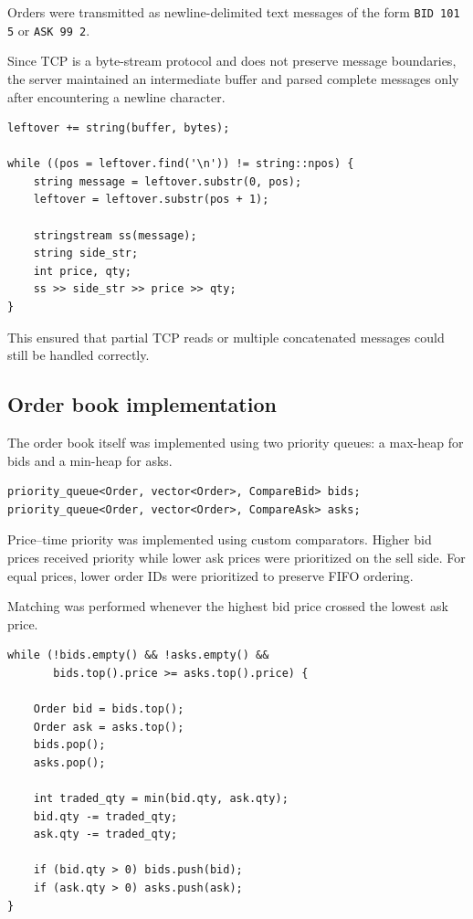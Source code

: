 \documentclass[11pt,a4paper]{article}
\begin{document}
Orders were transmitted as newline-delimited text messages of the form
\texttt{BID 101 5} or \texttt{ASK 99 2}.

Since TCP is a byte-stream protocol and does not preserve message
boundaries, the server maintained an intermediate buffer and parsed complete
messages only after encountering a newline character.

\begin{lstlisting}[caption={Message parsing logic}]
leftover += string(buffer, bytes);

while ((pos = leftover.find('\n')) != string::npos) {
    string message = leftover.substr(0, pos);
    leftover = leftover.substr(pos + 1);

    stringstream ss(message);
    string side_str;
    int price, qty;
    ss >> side_str >> price >> qty;
}
\end{lstlisting}

This ensured that partial TCP reads or multiple concatenated messages could
still be handled correctly.

\subsection{Order book implementation}

The order book itself was implemented using two priority queues: a max-heap
for bids and a min-heap for asks.

\begin{lstlisting}[caption={Order book data structures}]
priority_queue<Order, vector<Order>, CompareBid> bids;
priority_queue<Order, vector<Order>, CompareAsk> asks;
\end{lstlisting}

Price--time priority was implemented using custom comparators. Higher bid
prices received priority while lower ask prices were prioritized on the sell
side. For equal prices, lower order IDs were prioritized to preserve FIFO
ordering.

Matching was performed whenever the highest bid price crossed the lowest
ask price.

\begin{lstlisting}[caption={Matching logic}]
while (!bids.empty() && !asks.empty() &&
       bids.top().price >= asks.top().price) {

    Order bid = bids.top();
    Order ask = asks.top();
    bids.pop();
    asks.pop();

    int traded_qty = min(bid.qty, ask.qty);
    bid.qty -= traded_qty;
    ask.qty -= traded_qty;

    if (bid.qty > 0) bids.push(bid);
    if (ask.qty > 0) asks.push(ask);
}
\end{lstlisting}
\end{document}
